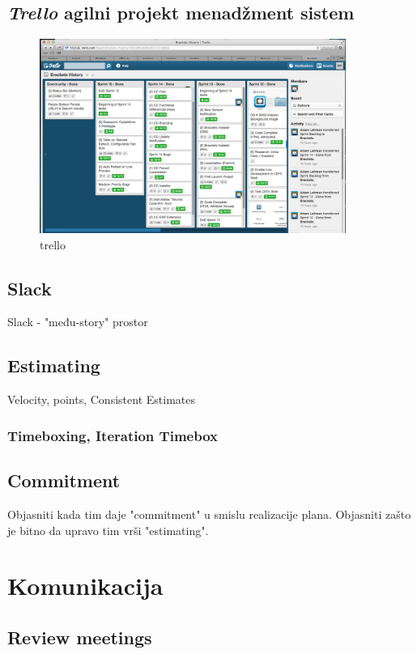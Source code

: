 \documentclass[lmodern, utf8, zavrsni]{fit}
\begin{document}
\section{\emph{Trello} agilni projekt menadžment sistem}

\begin{figure}[H]
\centering
\includegraphics[width=10cm]{img/brackets_trello_sprint_history.png}
\caption{trello}
\end{figure}

\section{Slack}

Slack - "među-story" prostor\citep[str. 275]{agileart}

\section{Estimating}

Velocity, points,  Consistent Estimates

\subsection{Timeboxing, Iteration Timebox}

\section{Commitment}

Objasniti kada tim daje "commitment" u smislu realizacije plana.
Objasniti zašto je bitno da upravo tim vrši "estimating".

\chapter{Komunikacija}

\section{Review meetings}
\end{document}
